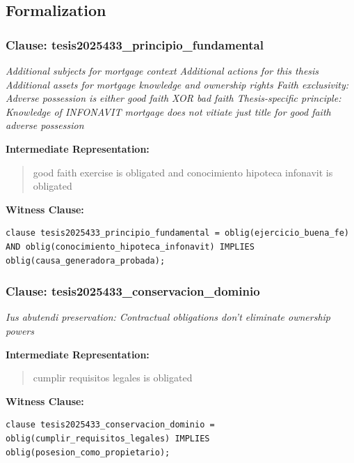\documentclass[11pt,a4paper]{article}
\begin{document}
\subsection{Formalization}

\subsubsection{Clause: tesis2025433\_principio\_fundamental}

\textit{Additional subjects for mortgage context Additional actions for this thesis Additional assets for mortgage knowledge and ownership rights Faith exclusivity: Adverse possession is either good faith XOR bad faith Thesis-specific principle: Knowledge of INFONAVIT mortgage does not vitiate just title for good faith adverse possession}

\textbf{Intermediate Representation:}

\begin{quote}
good faith exercise is obligated and conocimiento hipoteca infonavit is obligated
\end{quote}

\textbf{Witness Clause:}

\begin{lstlisting}[style=witnessstyle, language=Witness]
clause tesis2025433_principio_fundamental = oblig(ejercicio_buena_fe) AND oblig(conocimiento_hipoteca_infonavit) IMPLIES oblig(causa_generadora_probada);
\end{lstlisting}

\subsubsection{Clause: tesis2025433\_conservacion\_dominio}

\textit{Ius abutendi preservation: Contractual obligations don't eliminate ownership powers}

\textbf{Intermediate Representation:}

\begin{quote}
cumplir requisitos legales is obligated
\end{quote}

\textbf{Witness Clause:}

\begin{lstlisting}[style=witnessstyle, language=Witness]
clause tesis2025433_conservacion_dominio = oblig(cumplir_requisitos_legales) IMPLIES oblig(posesion_como_propietario);
\end{lstlisting}
\end{document}
